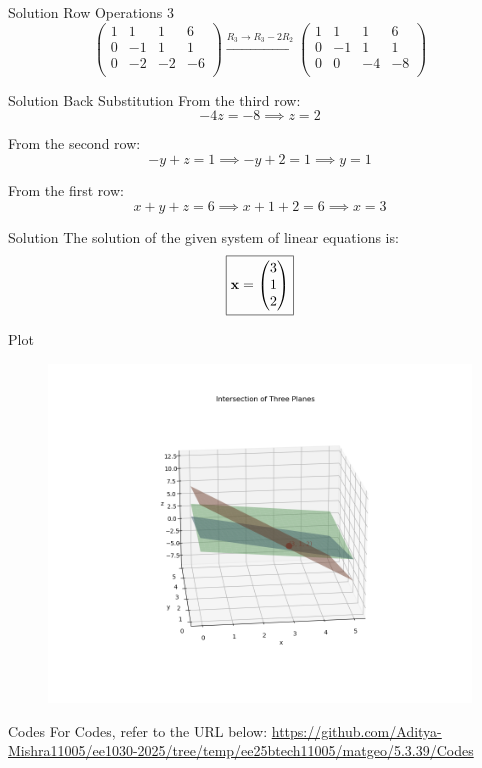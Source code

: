\documentclass{beamer}
\begin{document}
\begin{frame}{Solution}
	Row Operations 3
\[
\left(
\begin{array}{ccc|c}
1 & 1 & 1 & 6 \\
0 & -1 & 1 & 1 \\
0 & -2 & -2 & -6 \\
\end{array}
\right)
\xrightarrow{R_3 \rightarrow R_3 - 2R_2}
\left(
\begin{array}{ccc|c}
1 & 1 & 1 & 6 \\
0 & -1 & 1 & 1 \\
0 & 0 & -4 & -8 \\
\end{array}
\right)
\]
\end{frame}

\begin{frame}{Solution}
	Back Substitution
From the third row:
\[
-4z = -8 \implies z = 2
\]

From the second row:
\[
-y + z = 1 \implies -y + 2 = 1 \implies y = 1
\]

From the first row:
\[
x + y + z = 6 \implies x + 1 + 2 = 6 \implies x = 3
\]
\end{frame}

\begin{frame}{Solution}
	The solution of the given system of linear equations is:
\[
\boxed{
\mathbf{x} = \begin{pmatrix}3 \\ 1 \\ 2\end{pmatrix}
}
\]
\end{frame}
\begin{frame}{Plot}
\begin{figure}
    \centering
    \includegraphics[width=0.8\columnwidth]{Figs/Figure_1.png}
\end{figure}
\end{frame}
\begin{frame}{Codes}
\centering
For Codes, refer to the URL below:  
\url{https://github.com/Aditya-Mishra11005/ee1030-2025/tree/temp/ee25btech11005/matgeo/5.3.39/Codes}
\end{frame}
\end{document}
